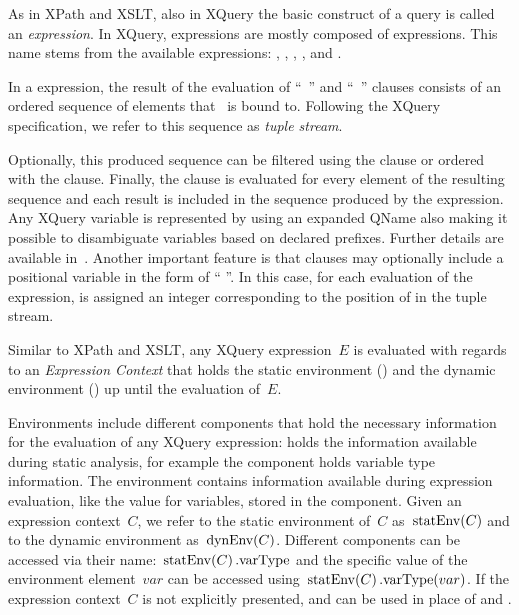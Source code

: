 As in \ac{XPath} and \ac{XSLT}, also in XQuery the basic construct of a query is called an \emph{expression}.  In
XQuery, expressions are mostly composed of \FLWOR expressions.
%
This name stems from the available expressions: \FOR, \LET, \WHERE, \ORDERBY, and \RETURN.
%
\begin{definition}
  In a \FLWOR expression, the result of the evaluation of ``\FOR~'' and ``\LET~'' clauses
  consists of an ordered sequence of elements that~ is bound to.  Following the XQuery specification, we refer to
  this sequence as \emph{tuple stream}.
\end{definition}
%
Optionally, this produced sequence can be filtered using the \WHERE clause or ordered with the \ORDERBY clause.
%
Finally, the \RETURN clause is evaluated for every element of the resulting sequence and each result is included in the
sequence produced by the \FLWOR expression.
%
Any XQuery variable is represented by using an expanded QName also making it possible to disambiguate variables based on
declared prefixes. Further details are available in~\citet[Section 3.1.1.1]{DraperFankhauserFernandez:2010aa}.
%
Another important feature is that \FOR clauses may optionally include a positional variable in the form of ``\FOR
{} \AT {}''.  In this case, for each evaluation of the \RETURN expression,  is assigned an
integer corresponding to the position of  in the tuple stream.
%


\begin{definition}
  Similar to \ac{XPath} and \ac{XSLT}, any XQuery expression~$E$ is evaluated with regards to an \emph{Expression
    Context} that holds the static environment (\stat) and the dynamic environment (\dyn) up until the evaluation
  of~$E$.
\end{definition}
%
Environments include different components that hold the necessary information for the evaluation of any XQuery
expression: \stat{} holds the information available during static analysis, for example the  component
holds variable type information.
%
The \dyn{} environment contains information available during expression evaluation, like the value for variables, stored
in the  component.
%
Given an expression context~$C$, we refer to the static environment of~$C$ as~$\mathit{\mathrm{statEnv}}\!\left(C\right)$ and to the dynamic
environment as~$\mathit{{\textrm{dynEnv}}}\!\left(C\right)$.  Different components can be accessed via their
name:~$\mathit{\mathrm{statEnv}}\!\left(C\right).\textrm{varType}$ and the specific value of the environment element~$var$ can be accessed
using~$\mathit{\mathrm{statEnv}}\!\left(C\right).\textrm{varType}(var)$.  If the expression context~$C$ is not explicitly presented, \stat and
\dyn can be used in place of  and .



